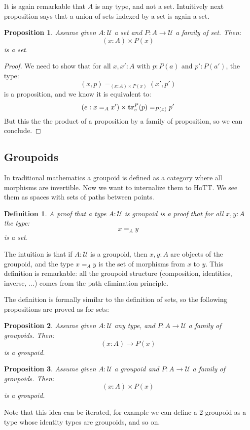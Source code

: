 \documentclass{article}
\newcommand{\sse}[1]{\medbreak \subsection{#1}}
\newcommand{\U}{{\mathcal U}}
\renewcommand{\r}{\rightarrow}
\newcommand{\tr}{\mathrm{\bf tr}}
\newtheorem{definition}{Definition}
\newtheorem{proposition}{Proposition}
\begin{document}
It is again remarkable that $A$ is any type, and not a set. Intuitively next proposition says that a union of sets indexed by a set is again a set.

\begin{proposition}
Assume given $A:\U$ a set and $P:A\r \U$ a family of set. Then:
\[(x:A)\times P(x)\]
is a set.
\end{proposition}
\begin{proof}
We need to show that for all $x,x':A$ with $p:P(a)$ and $p':P(a')$, the type:
\[(x,p)=_{(x:A)\times P(x)}(x',p')\]
is a proposition, and we know it is equivalent to:
\[(e:x=_Ax')\times \tr^P_e(p) =_{P(x)} p'\]
But this the the product of a proposition by a family of proposition, so we can conclude.
\end{proof}


\sse{Groupoids}

In traditional mathematics a groupoid is defined as a category where all morphisms are invertible. Now we want to internalize them to HoTT. We see them as spaces with sets of paths between points.

\begin{definition}
A proof that a type $A:\U$ is groupoid is a proof that for all $x,y:A$ the type:
\[x=_Ay\]
is a set.
\end{definition}

The intuition is that if $A:\U$ is a groupoid, then $x,y:A$ are objects of the groupoid, and the type $x=_Ay$ is the set of morphisms from $x$ to $y$.
This definition is remarkable: all the groupoid structure (composition, identities, inverse, ...) comes from the path elimination principle.

The definition is formally similar to the definition of sets, so the following propositions are proved as for sets:

\begin{proposition}
Assume given $A:\U$ any type, and $P:A\r \U$ a family of groupoids. Then:
\[(x:A)\r P(x)\]
is a groupoid.
\end{proposition}

\begin{proposition}
Assume given $A:\U$ a groupoid and $P:A\r \U$ a family of groupoids. Then:
\[(x:A)\times P(x)\]
is a groupoid.
\end{proposition}

 Note that this idea can be iterated, for example we can define a $2$-groupoid as a type whose identity types are groupoids, and so on.
\end{document}
